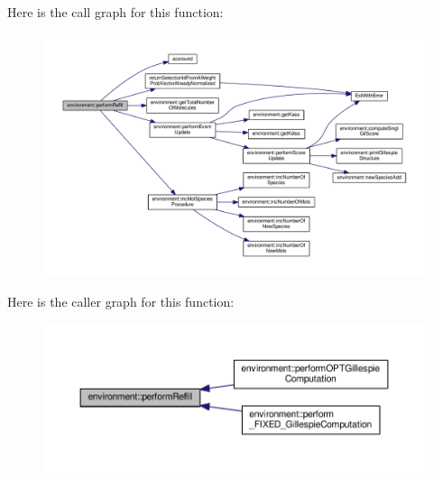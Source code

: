 Here is the call graph for this function\-:\nopagebreak
\begin{figure}[H]
\begin{center}
\leavevmode
\includegraphics[width=350pt]{a00003_a8a53821ad1675b0da50591616aac3b74_cgraph}
\end{center}
\end{figure}




Here is the caller graph for this function\-:\nopagebreak
\begin{figure}[H]
\begin{center}
\leavevmode
\includegraphics[width=350pt]{a00003_a8a53821ad1675b0da50591616aac3b74_icgraph}
\end{center}
\end{figure}


